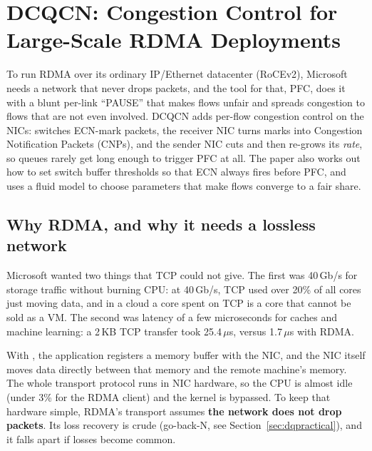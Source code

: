 \chapter{DCQCN: Congestion Control for Large-Scale RDMA Deployments}

\begin{keybox}
To run RDMA over its ordinary IP/Ethernet datacenter (RoCEv2), Microsoft needs a network that never drops packets, and the tool for that,
PFC, does it with a blunt per-link ``PAUSE'' that makes flows unfair and spreads congestion to flows that are not even involved. DCQCN
adds per-flow congestion control on the NICs: switches ECN-mark packets, the receiver NIC turns marks into Congestion Notification
Packets (CNPs), and the sender NIC cuts and then re-grows its \emph{rate}, so queues rarely get long enough to trigger PFC at all. The paper also
works out how to set switch buffer thresholds so that ECN always fires before PFC, and uses a fluid model to choose parameters that make
flows converge to a fair share.
\end{keybox}

\section{Why RDMA, and why it needs a lossless network}

Microsoft wanted two things that TCP could not give. The first was 40\,Gb/s for storage traffic without burning CPU: at 40\,Gb/s, TCP
used over 20\% of all cores just moving data, and in a cloud a core spent on TCP is a core that cannot be sold as a VM. The second was
latency of a few microseconds for caches and machine learning: a 2\,KB TCP transfer took 25.4\,$\mu$s, versus 1.7\,$\mu$s with RDMA.

With , the application registers a memory buffer with the NIC, and the NIC itself moves data directly between that memory and the
remote machine's memory. The whole transport protocol runs in NIC hardware, so the CPU is almost idle (under 3\% for the RDMA client) and the
kernel is bypassed. To keep that hardware simple, RDMA's transport assumes \textbf{the network does not drop packets}. Its loss recovery is
crude (go-back-N, see Section~\ref{sec:dqpractical}), and it falls apart if losses become common.

